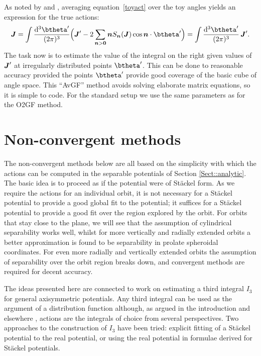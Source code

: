 \documentclass[useAMS,usenatbib,fleqn,a4paper]{mn2e}
\newcommand{\bs}[1]{\bmath{#1}}
\begin{document}
As noted by \cite{Bovy2014} and \cite{Fox2014}, averaging
equation~\eqref{toyact} over the toy angles yields an expression for the
true actions:
\begin{equation}
\bs{J}=\int{\mathrm{d}^3\btheta'\over(2\pi)^3}
\Big(\boldsymbol{J}'-2\sum_{\bs{n}>\bs{0}}\bs{n}S_{\bs{n}}(\bs{J})\cos\bs{n}\cdot\btheta'\Big)
=\int{\mathrm{d}^3\btheta'\over(2\pi)^3}\,\boldsymbol{J}'.
\end{equation}
 The task now is to estimate the value of the integral on the right given values
of $\bs{J}'$ at irregularly distributed points $\btheta'$. This can be done to
reasonable accuracy provided the points $\btheta'$ provide good coverage of
the basic cube of angle space. This ``AvGF'' method avoids solving elaborate matrix
equations, so it is simple to code. For the standard setup we use the same
parameters as for the O2GF method.

\section{Non-convergent methods}\label{Sect::MethodsNC}

The non-convergent methods below are all based on the simplicity with
which the actions can be computed in the separable potentials of
Section \ref{Sect::analytic}. The basic idea is to proceed as if the potential were of St\"ackel
form. As we require the actions for an individual orbit, it is not necessary
for a St\"ackel potential to provide a good global fit to the potential; it
suffices for a St\"ackel potential to provide a good fit over the region
explored by the orbit. For orbits that stay close to the plane, we will see that the
assumption of cylindrical separability works well, whilst for more vertically
and radially extended orbits a better approximation is found to be
separability in prolate spheroidal coordinates.  For even more radially and
vertically extended orbits the assumption of separability over the orbit
region breaks down, and convergent methods are required for decent accuracy.

The ideas presented here are connected to work on estimating a third
integral $I_3$ for general axisymmetric potentials. Any third integral can be
used as the argument of a distribution function although, as argued in the
introduction and elsewhere \citep[e.g.][]{BinneyMcMillan2015}, actions are
the integrals of choice from several perspectives. Two approaches to the
construction of $I_3$ have been tried: explicit fitting of a St\"ackel
potential to the real potential, or using the real potential in formulae
derived for St\"ackel potentials.
\end{document}
